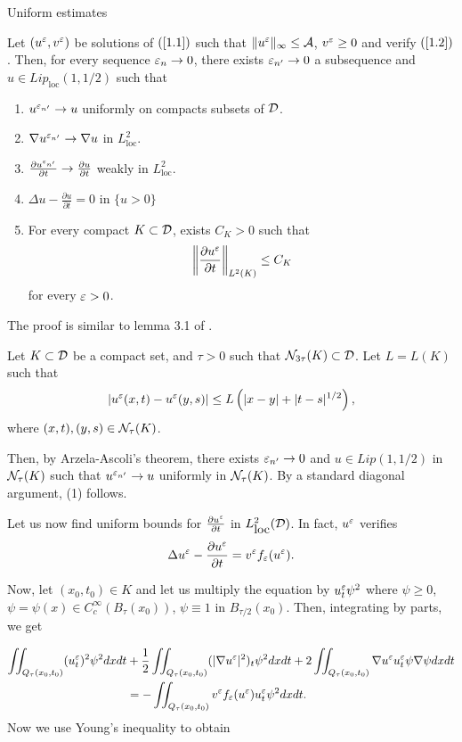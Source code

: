 \begin{section}{Uniform estimates}
\begin{prop}
\label{lim}
Let $(u^{\varepsilon}, v^{\varepsilon})$ be solutions of $(\ref{1.1})$ such that 
$\| u^{\varepsilon} \|_{\infty}\leq {\cal A}$, $ v^{\varepsilon}\ge0$ and verify
$(\ref{1.2})$. Then, for every sequence
$\varepsilon_{n}\to 0$, there exists $\varepsilon_{n'}\to 0$ a subsequence and 
$u\in Lip_{\mbox{loc}}(1,1/2)$ such that
\begin{enumerate}
\item $u^{\varepsilon_{n'}}\to u$ uniformly on compacts subsets of ${\cal D}$.
\item $\nabla u^{\varepsilon_{n'}}\to \nabla u$ in $L^{2}_{\mbox{loc}}$.
\item $\frac{\partial u^{\varepsilon_{n'}}}{\partial t}\to 
\frac{\partial u}{\partial t}$ weakly in $L^{2}_{\mbox{loc}}$.
\item $\Delta u - \frac{\partial u}{\partial t} = 0$ in 
$\{ u>0 \}$
\item For every compact $K\subset {\cal D}$, exists $C_{K}>0$ such that
$$\left\| \frac{\partial u^{\varepsilon}}{\partial t} \right\|_{L^{2}(K)}\leq C_{K}$$
for every $\varepsilon>0$.
\end{enumerate}
\end{prop}

\begin{pf}
The proof is similar to lemma 3.1 of \cite{CLW1}.

Let $K\subset{\cal D}$ be a compact set, and $\tau>0$ such that
${\cal N}_{3\tau}(K)\subset{\cal D}$.
Let $L=L(K)$ such that
$$| u^{\varepsilon}(x,t)-u^{\varepsilon}(y,s) |\le L\left( |x-y|+|t-s|^{1/2}\right),$$
where $(x,t), (y,s)\in {\cal N}_{\tau}(K)$.

Then, by Arzela-Ascoli's theorem, there exists $\varepsilon_{n^{\prime}}\to 0$ and
$u\in Lip(1,1/2)$ in ${\cal N}_{\tau}(K)$ such that
$u^{\varepsilon_{n^{\prime}}}\to u$ uniformly in ${\cal N}_{\tau}(K)$.
By a standard diagonal argument, (1) follows.

Let us now find uniform bounds for $\frac{\partial u^{\varepsilon}}{\partial t}$ in
$L^2_{\mbox{loc}}({\cal D})$. In fact, $u^{\varepsilon}$ verifies
$$\Delta u^{\varepsilon} - \frac{\partial u^{\varepsilon}}{\partial t} = 
v^{\varepsilon}f_{\varepsilon}(u^{\varepsilon}).$$

Now, let $(x_0,t_0)\in K$ and let us multiply the equation by 
$u^{\varepsilon}_{t}\psi^2$ where $\psi\ge0$, 
$\psi=\psi(x)\in C^{\infty}_{c}(B_{\tau}(x_0))$, $\psi\equiv 1$ in 
$B_{\tau/2}(x_0)$. Then, integrating by parts, we get

\begin{align*}
\iint_{Q_{\tau}(x_0,t_0)}(u^{\varepsilon}_{t})^2\psi^2 dxdt &+
\frac12 \iint_{Q_{\tau}(x_0,t_0)} (|\nabla u^{\varepsilon}|^2)_t \psi^2 dxdt +
2 \iint_{Q_{\tau}(x_0,t_0)} \nabla u^{\varepsilon} u^{\varepsilon}_t \psi \nabla \psi dxdt\\
& = -\iint_{Q_{\tau}(x_0,t_0)} v^{\varepsilon}f_{\varepsilon}(u^{\varepsilon})u^{\varepsilon}_t \psi^2 dxdt.
\end{align*}
Now we use Young's inequality to obtain


\end{pf}
\end{section}
